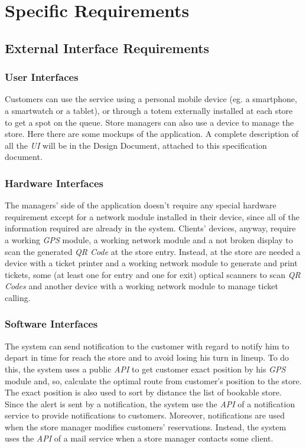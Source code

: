 \documentclass{article}
\begin{document}
\section{Specific Requirements}

	\subsection{External Interface Requirements}
	
		\subsubsection{User Interfaces}
		
			Customers can use the service using a personal mobile device (eg. a smartphone, a smartwatch or a tablet), or through a totem externally installed at each store to get a spot on the queue. Store managers can also use a device to manage the store. Here there are some mockups of the application. A complete description of all the \emph{UI} will be in the Design Document, attached to this specification document.
		\subsubsection{Hardware Interfaces}
		
			The managers’ side of the application doesn’t require any special hardware requirement except for a network module installed in their device, since all of the information required are already in the system. Clients’ devices, anyway, require a working \emph{GPS} module, a working network module and a not broken display to scan the generated \emph{QR Code} at the store entry. Instead, at the store are needed a device with a ticket printer and a working network module to generate and print tickets, some (at least one for entry and one for exit) optical scanners to scan \emph{QR Codes} and another device with a working network module to manage ticket calling.
			
			
		\subsubsection{Software Interfaces}
		
			The system can send notification to the customer with regard to notify him to depart in time for reach the store and to avoid losing his turn in lineup. To do this, the system uses a public \emph{API} to get customer exact position by his \emph{GPS} module and, so, calculate the optimal route from customer's position to the store. The exact position is also used to sort by distance the list of bookable store. Since the alert is sent by a notification, the system use the \emph{API} of a notification service to provide notifications to customers. Moreover, notifications are used when the store manager modifies customers' reservations. Instead, the system uses the \emph{API} of a mail service when a store manager contacts some client.
			
\end{document}
